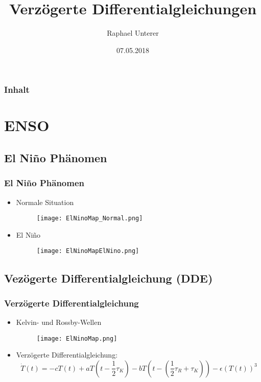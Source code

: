 \documentclass{beamer}
\title{Verzögerte Differentialgleichungen}
\author{Raphael Unterer}
\institute{Mathematisches Seminar 2018}
\date{07.05.2018}
\begin{document}
\begin{frame}
\titlepage
\end{frame}

\begin{frame}
\frametitle{Inhalt}
\tableofcontents
\end{frame}

\section{ENSO}

\subsection{El Niño Phänomen}
\begin{frame}
	\frametitle{El Niño Phänomen}
	\begin{itemize}
		\item[] Normale Situation
		\begin{figure}
			\texttt{[image: ElNinoMap\_Normal.png]}
		\end{figure}
		\pause
		\item[] El Niño
		\begin{figure}
			\texttt{[image: ElNinoMapElNino.png]}
		\end{figure}
	\end{itemize}
\end{frame}

\subsection{Vezögerte Differentialgleichung (DDE)} 
\begin{frame}
	\frametitle{Verzögerte Differentialgleichung}
	\begin{itemize}
		\item[] Kelvin- und Rossby-Wellen
		\begin{figure}
			\texttt{[image: ElNinoMap.png]}
		\end{figure}
		\pause
		\item[] Verzögerte Differentialgleichung:
		\begin{equation}
			\dot{T}(t)=-cT(t)+aT(t-\frac{1}{2}\tau_K)-bT(t-(\frac{1}{2}\tau_R+\tau_K))-\epsilon(T(t))^3
		\end{equation}
	\end{itemize}
\end{frame}
\end{document}
